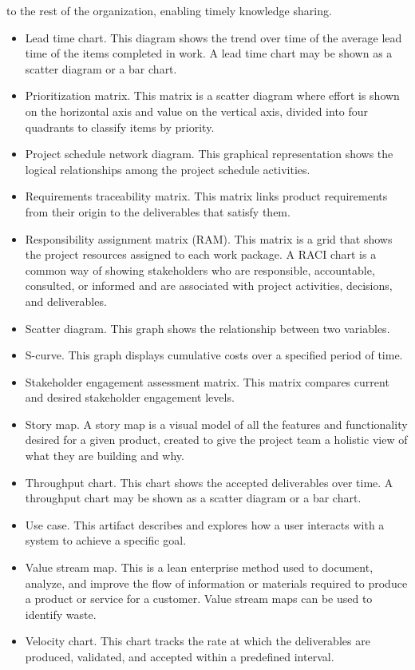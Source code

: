 \documentclass[11pt]{article}
\begin{document}
to the rest of the organization, enabling timely knowledge sharing.
\begin{itemize}
\item Lead time chart. This diagram shows the trend over time of the average lead time of the items completed in work. A lead time chart may be shown as a scatter diagram or a bar chart.
\item Prioritization matrix. This matrix is a scatter diagram where effort is shown on the horizontal axis and value on the vertical axis, divided into four quadrants to classify items by priority.
\item Project schedule network diagram. This graphical representation shows the logical relationships among the project schedule activities.
\item Requirements traceability matrix. This matrix links product requirements from their origin to the deliverables that satisfy them.
\item Responsibility assignment matrix (RAM). This matrix is a grid that shows the project resources assigned to each work package. A RACI chart is a common way of showing stakeholders who are responsible, accountable, consulted, or informed and are associated with project activities, decisions, and deliverables.
\item Scatter diagram. This graph shows the relationship between two variables.
\item S-curve. This graph displays cumulative costs over a specified period of time.
\item Stakeholder engagement assessment matrix. This matrix compares current and desired stakeholder engagement levels.
\item Story map. A story map is a visual model of all the features and functionality desired for a given product, created to give the project team a holistic view of what they are building and why.
\item Throughput chart. This chart shows the accepted deliverables over time. A throughput chart may be shown as a scatter diagram or a bar chart.
\item Use case. This artifact describes and explores how a user interacts with a system to achieve a specific goal.
\item Value stream map. This is a lean enterprise method used to document, analyze, and improve the flow of information or materials required to produce a product or service for a customer. Value stream maps can be used to identify waste.
\item Velocity chart. This chart tracks the rate at which the deliverables are produced, validated, and accepted within a predefined interval.
\end{itemize}
\end{document}
